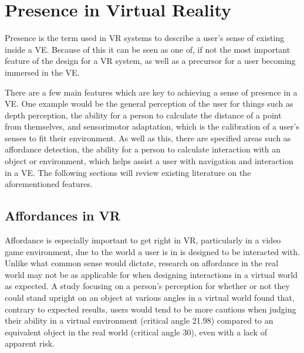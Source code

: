 \section{Presence in Virtual Reality}
\label{lr:vr}

	Presence is the term used in VR systems to describe a user's sense of existing inside a VE. Because of this it can be seen as one of, if not the most important feature of the design for a VR system, as well as a precursor for a user becoming immersed in the VE.

	There are a few main features which are key to achieving a sense of presence in a VE. One example would be the general perception of the user for things such as depth perception, the ability for a person to calculate the distance of a point from themselves, and sensorimotor adaptation, which is the calibration of a user's senses to fit their environment.
	As well as this, there are specified areas such as affordance detection, the ability for a person to calculate interaction with an object or environment, which helps assist a user with navigation and interaction in a VE.
	The following sections will review existing literature on the aforementioned features.

	\subsection{Affordances in VR}
	\label{lr:vr:affordances}
		Affordance is especially important to get right in VR, particularly in a video game environment, due to the world a user is in is designed to be interacted with.
		Unlike what common sense would dictate, research on affordance in the real world may not be as applicable for when designing interactions in a virtual world as expected.
		A study \cite{Regia-Corte2012} focusing on a person's perception for whether or not they could stand upright on an object at various angles in a virtual world found that, contrary to expected results, users would tend to be more cautious when judging their ability in a virtual environment (critical angle 21.98\degree) compared to an equivalent object in the real world (critical angle 30\degree), even with a lack of apparent risk.

